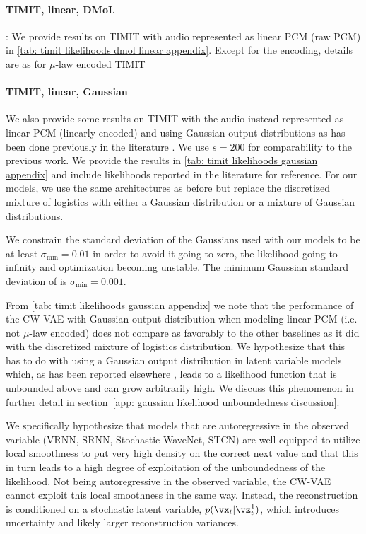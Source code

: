 \paragraph{TIMIT, linear, DMoL}: We provide results on TIMIT with audio represented as linear PCM (raw PCM) in \cref{tab: timit likelihoods dmol linear appendix}. Except for the encoding, details are as for $\mu$-law encoded TIMIT

\paragraph{TIMIT, linear, Gaussian} We also provide some results on TIMIT with the audio instead represented as linear PCM (linearly encoded) and using Gaussian output distributions as has been done previously in the literature \cite{chung_recurrent_2015, fraccaro_sequential_2016, lai_stochastic_2018, aksan_stcn_2019}. We use $s=200$ for comparability to the previous work. We provide the results in \cref{tab: timit likelihoods gaussian appendix} and include likelihoods reported in the literature for reference. For our models, we use the same architectures as before but replace the discretized mixture of logistics with either a Gaussian distribution or a mixture of Gaussian distributions. 

We constrain the standard deviation of the Gaussians used with our models to be at least $\sigma_\text{min} = 0.01$ in order to avoid it going to zero, the likelihood going to infinity and optimization becoming unstable. The minimum Gaussian standard deviation of \citet{aksan_stcn_2019} is $\sigma_\text{min} = 0.001$.

From \cref{tab: timit likelihoods gaussian appendix} we note that the performance of the CW-VAE with Gaussian output distribution when modeling linear PCM (i.e. not $\mu$-law encoded) does not compare as favorably to the other baselines as it did with the discretized mixture of logistics distribution. We hypothesize that this has to do with using a Gaussian output distribution in latent variable models which, as has been reported elsewhere \cite{mattei_leveraging_2018}, leads to a likelihood function that is unbounded above and can grow arbitrarily high. We discuss this phenomenon in further detail in section~\cref{app: gaussian likelihood unboundedness discussion}. 

We specifically hypothesize that models that are autoregressive in the observed variable (VRNN, SRNN, Stochastic WaveNet, STCN) are well-equipped to utilize local smoothness to put very high density on the correct next value and that this in turn leads to a high degree of exploitation of the unboundedness of the likelihood. Not being autoregressive in the observed variable, the CW-VAE cannot exploit this local smoothness in the same way. Instead, the reconstruction is conditioned on a stochastic latent variable, $p(\vx_t|\vz^1_t)$, which introduces uncertainty and likely larger reconstruction variances.


